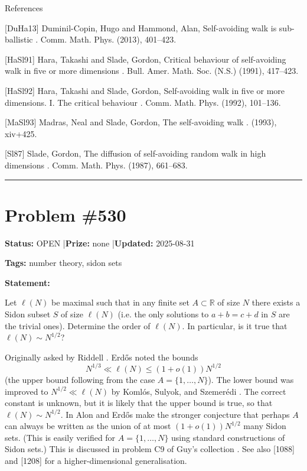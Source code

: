 \documentclass{article}
\begin{document}
References

[DuHa13] Duminil-Copin, Hugo and Hammond, Alan, Self-avoiding walk is sub-ballistic . Comm. Math. Phys. (2013), 401--423.

[HaSl91] Hara, Takashi and Slade, Gordon, Critical behaviour of self-avoiding walk in five or more dimensions . Bull. Amer. Math. Soc. (N.S.) (1991), 417--423.

[HaSl92] Hara, Takashi and Slade, Gordon, Self-avoiding walk in five or more dimensions. I. The critical behaviour . Comm. Math. Phys. (1992), 101--136.

[MaSl93] Madras, Neal and Slade, Gordon, The self-avoiding walk . (1993), xiv+425.

[Sl87] Slade, Gordon, The diffusion of self-avoiding random walk in high dimensions . Comm. Math. Phys. (1987), 661--683.

\noindent\rule{\linewidth}{0.4pt}


\section{Problem \#530}
\label{prob:530}

\noindent\textbf{Status:} OPEN \quad|\quad \textbf{Prize:} none \quad|\quad \textbf{Updated:} 2025-08-31

\noindent\textbf{Tags:} number theory, sidon sets

\medskip

\noindent\textbf{Statement:}

Let $\ell(N)$ be maximal such that in any finite set $A\subset \mathbb{R}$ of size $N$ there exists a Sidon subset $S$ of size $\ell(N)$ (i.e. the only solutions to $a+b=c+d$ in $S$ are the trivial ones). Determine the order of $\ell(N)$. In particular, is it true that $\ell(N)\sim N^{1/2}$?




Originally asked by Riddell \cite{Ri69}. Erd\H{o}s noted the bounds\[N^{1/3} \ll \ell(N) \leq (1+o(1))N^{1/2}\](the upper bound following from the case $A=\{1,\ldots,N\}$). The lower bound was improved to $N^{1/2}\ll \ell(N)$ by Koml\'{o}s, Sulyok, and Szemer\'{e}di \cite{KSS75}. The correct constant is unknown, but it is likely that the upper bound is true, so that $\ell(N)\sim N^{1/2}$. In \cite{AlEr85} Alon and Erd\H{o}s make the stronger conjecture that perhaps $A$ can always be written as the union of at most $(1+o(1))N^{1/2}$ many Sidon sets. (This is easily verified for $A=\{1,\ldots,N\}$ using standard constructions of Sidon sets.) This is discussed in problem C9 of Guy's collection \cite{Gu04}. See also [1088] and [1208] for a higher-dimensional generalisation.
\end{document}
